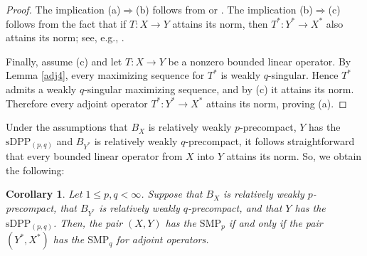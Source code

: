 \documentclass[12 pt]{article}%
\newtheorem{corollary}[theorem]{Corollary}
\newtheorem{final remark}[theorem]{Final Remark}
\begin{document}
\begin{proof}
The implication {\rm (a)}$\Rightarrow${\rm (b)} follows from \cite[Proposition 2.1]{mishra} or \cite[Lemma 5.1]{garcia-lirola}. The implication {\rm (b)}$\Rightarrow${\rm (c)} follows from the fact that if $T:X\to Y$ attains its norm, then $T^*:Y^*\to X^*$ also attains its norm; see, e.g., \cite[p. 3]{mishra}.

Finally, assume {\rm (c)} and let $T:X\to Y$ be a nonzero bounded linear operator. By Lemma \ref{adj4}, every maximizing sequence for $T^*$ is weakly $q$-singular. Hence $T^*$ admits a weakly $q$-singular maximizing sequence, and by {\rm (c)} it attains its norm. Therefore every adjoint operator $T^*:Y^*\to X^*$ attains its norm, proving {\rm (a)}.
\end{proof}



Under the assumptions that $B_X$ is relatively weakly $p$-precompact, $Y$ has the $\mathrm{sDPP}_{(p,q)}$ and $B_{Y^*}$ is relatively weakly $q$-precompact, it follows straightforward that every bounded linear operator from $X$ into $Y$ attains its norm. So, we obtain the following:



\begin{corollary}\label{adj6}
Let $1\leq p,q<\infty$. Suppose that $B_X$ is relatively weakly $p$-precompact, that $B_{Y^*}$ is relatively weakly $q$-precompact, and that $Y$ has the $\mathrm{sDPP}_{(p,q)}$. Then, the pair $(X,Y)$ has the $\mathrm{SMP}_p$ if and only if the pair $(Y^*,X^*)$ has the $\mathrm{SMP}_q$ for adjoint operators.
\end{corollary}
\end{document}
